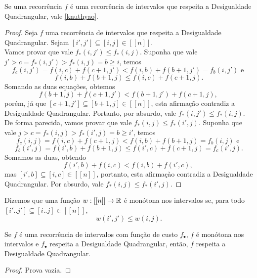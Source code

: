 \begin{theo} \label{qi_to_knuthyao}
Se uma recorrência $f$ é uma recorrência de intervalos que respeita a Desigualdade Quadrangular, vale \ref{knuthyao}.
\end{theo}

\begin{proof}
Seja $f$ uma recorrência de intervalos que respeita a Desigualdade Quadrangular. Sejam $[i',j'] \subseteq [i,j] \in [[n]]$.\\
Vamos provar que vale $f_*(i,j') \leq f_*(i,j)$. Suponha que vale $j' > c = f_*(i,j') > f_*(i,j) = b \geq i$, temos
$$ f_c(i,j') = f(i,c) + f(c+1,j') < f(i,b) + f(b+1,j') = f_b(i,j') \text{ e } $$
$$ f(i,b) + f(b+1,j) \leq f(i,c) + f(c+1,j) \text{.} $$
Somando as duas equações, obtemos
$$ f(b+1,j) + f(c+1,j') < f(b+1,j') + f(c+1,j) \text{, }$$
porém, já que $[c+1,j'] \subseteq [b+1,j] \in [[n]]$, esta afirmação contradiz a Desigualdade Quadrangular. Portanto, por absurdo, vale $f_*(i,j') \leq f_*(i,j)$. \\
De forma parecida, vamos provar que vale $f_*(i,j) \leq f_*(i',j)$. Suponha que vale $j > c = f_*(i,j) > f_*(i',j) = b \geq i'$, temos
$$ f_c(i,j) = f(i,c) + f(c+1,j) < f(i,b) + f(b+1,j) = f_b(i,j) \text{ e } $$
$$ f_b(i',j) = f(i',b) + f(b+1,j) \leq f(i',c) + f(c+1,j) = f_c(i',j) \text{.} $$
Somamos as duas, obtendo
$$ f(i',b) + f(i,c) < f(i,b) + f(i',c) \text{, }$$
mas $[i',b] \subseteq [i,c] \in [[n]]$, portanto, esta afirmaçào contradiz a Desigualdade Quadrangular. Por absurdo, vale $f_*(i,j) \leq f_*(i',j)$.
\end{proof}

\begin{defi} \label{mon_int}
Dizemos que uma função $w : [[n]] \to \mathbb{R}$ é monótona nos intervalos se, para todo $[i'..j'] \subseteq [i..j] \in [[n]]$,
$$ w(i',j') \leq w(i,j). $$
\end{defi}

\begin{theo} \label{qi_cost_to_rec}
Se $f$ é uma recorrência de intervalos com função de custo $f_\bullet$, $f$ é monótona nos intervalos e $f_\bullet$ respeita a Desigualdade Quadrangular, então, $f$ respeita a Desigualdade Quadrangular.
\end{theo}

\begin{proof}
Prova vazia.
\end{proof}


